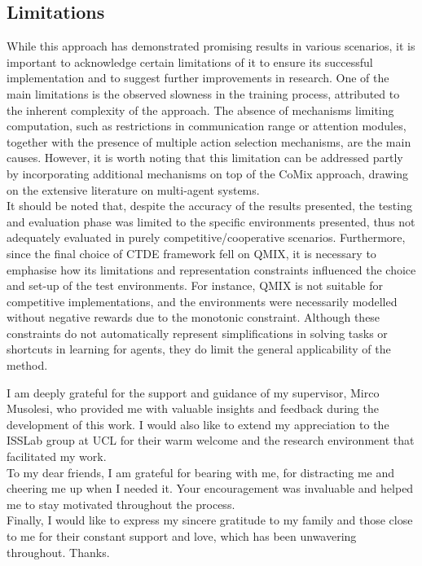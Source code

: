 \documentclass[a4paper,singleside,12pt]{report} %
\begin{document}
\subsection{Limitations}\label{limitations}
While this approach has demonstrated promising results in various scenarios, it is important to acknowledge certain limitations of it to ensure its successful implementation and to suggest further improvements in research. One of the main limitations is the observed slowness in the training process, attributed to the inherent complexity of the approach. The absence of mechanisms limiting computation, such as restrictions in communication range or attention modules, together with the presence of multiple action selection mechanisms, are the main causes. However, it is worth noting that this limitation can be addressed partly by incorporating additional mechanisms on top of the CoMix approach, drawing on the extensive literature on multi-agent systems.\\
It should be noted that, despite the accuracy of the results presented, the testing and evaluation phase was limited to the specific environments presented, thus not adequately evaluated in purely competitive/cooperative scenarios. Furthermore, since the final choice of CTDE framework fell on QMIX, it is necessary to emphasise how its limitations and representation constraints influenced the choice and set-up of the test environments. For instance, QMIX is not suitable for competitive implementations, and the environments were necessarily modelled without negative rewards due to the monotonic constraint. Although these constraints do not automatically represent simplifications in solving tasks or shortcuts in learning for agents, they do limit the general applicability of the method.

	\appendix
	
	\printbibliography[heading=bibintoc] %
	
	\acknowledgements
  I am deeply grateful for the support and guidance of my supervisor, Mirco Musolesi, who provided me with valuable insights and feedback during the development of this work. I would also like to extend my appreciation to the ISSLab group at UCL for their warm welcome and the research environment that facilitated my work.\\
  To my dear friends, I am grateful for bearing with me, for distracting me and cheering me up when I needed it. Your encouragement was invaluable and helped me to stay motivated throughout the process.\\
  Finally, I would like to express my sincere gratitude to my family and those close to me for their constant support and love, which has been unwavering throughout. Thanks.
\end{document}
